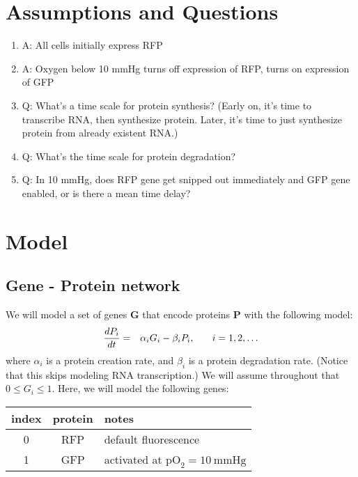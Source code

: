 \documentclass[12pt]{article}
\renewcommand{\vec}[1]{\mathbf{#1}}
\newcommand{\oxy}{  {\textrm{pO}_2} }
\newcommand{\mmHg}{\: \textrm{mmHg} }
\begin{document}
\section{Assumptions and Questions}
\begin{enumerate}

\item 
A: All cells initially express RFP

\item 
A: Oxygen below 10 mmHg turns off expression of RFP, turns on expression of GFP

\item 
Q: What's a time scale for protein synthesis? (Early on, it's time to transcribe RNA, then synthesize protein. Later, it's time to just synthesize protein from already existent RNA.) 

\item 
Q: What's the time scale for protein degradation? 

\item 
Q: In 10 mmHg, does RFP gene get snipped out immediately and GFP gene enabled, or is there a mean time delay? 


\end{enumerate}

\section{Model}

\subsection{Gene - Protein network}
We will model a set of genes $\vec{G}$ that encode proteins $\vec{P}$ with the following model: 
\begin{eqnarray}
\frac{ d P_i }{dt} & = & \alpha_i G_i - \beta_i P_i, \hspace{.25in} i = 1, 2, \ldots 
\end{eqnarray}
where $\alpha_i$ is a protein creation rate, and $\beta_i$ is a protein degradation rate. (Notice that this 
skips modeling RNA transcription.) We will assume throughout that $0 \le G_i \le 1$. 
Here, we will model the following genes: \\

\begin{center}
\begin{tabular}{c|c|l}
index & protein & notes \\
 \hline 
 0 & RFP & default fluorescence \\
 1 & GFP & activated at $\oxy = 10 \mmHg $ 
\end{tabular}
\end{center}
\end{document}
